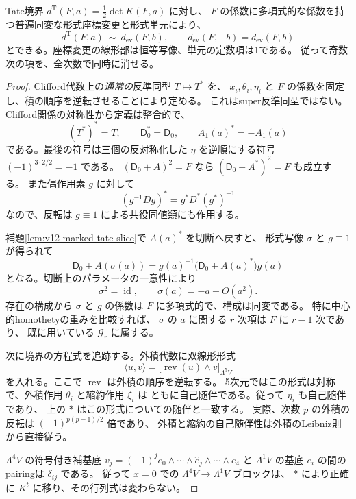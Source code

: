 \begin{theorem}[普遍境界の形式的な偶性]
\label{thm:v12-all-order-parity}
Tate境界 $d^{\mathrm T}(F,a)=\tfrac12\det K(F,a)$ に対し、
$F$ の係数に多項式的な係数を持つ普遍同変な形式座標変更と形式単元により、
\[
 d^{\mathrm T}(F,a)\ \sim\ d_{\mathrm{ev}}(F,b),\qquad
 d_{\mathrm{ev}}(F,-b)=d_{\mathrm{ev}}(F,b)
\]
とできる。座標変更の線形部は恒等写像、単元の定数項は1である。
従って奇数次の項を、全次数で同時に消せる。
\end{theorem}
\begin{proof}
Clifford代数上の\emph{通常の}反準同型 $T\mapsto T^*$ を、
$x_i,\theta_i,\eta_i$ と $F$ の係数を固定し、積の順序を逆転させることにより定める。
これはsuper反準同型ではない。
Clifford関係の対称性から定義は整合的で、
\[
 (T^*)^*=T,\qquad \mathsf D_0^*=\mathsf D_0,\qquad
 A_1(a)^*=-A_1(a)
\]
である。最後の符号は三個の反対称化した $\eta$ を逆順にする符号
$(-1)^{3\cdot2/2}=-1$ である。
$(\mathsf D_0+A)^2=F$ なら $(\mathsf D_0+A^*)^2=F$ も成立する。
また偶作用素 $g$ に対して
\[
 (g^{-1}Dg)^*=g^*D^*(g^*)^{-1}
\]
なので、反転は $g\equiv1$ による共役同値類にも作用する。

補題\ref{lem:v12-marked-tate-slice}で $A(a)^*$ を切断へ戻すと、
形式写像 $\sigma$ と $g\equiv1$ が得られて
\begin{equation}\label{eq:v12-reversion-regauging}
 \mathsf D_0+A(\sigma(a))
 =g(a)^{-1}\bigl(\mathsf D_0+A(a)^*\bigr)g(a)
\end{equation}
となる。切断上のパラメータの一意性により
\[
 \sigma^2=\operatorname{id},\qquad \sigma(a)=-a+O(a^2).
\]
存在の構成から $\sigma$ と $g$ の係数は $F$ に多項式的で、構成は同変である。
特に中心的homothetyの重みを比較すれば、
$\sigma$ の $a$ に関する $r$ 次項は $F$ に $r-1$ 次であり、
既に用いている $\mathcal G_r$ に属する。

次に境界の方程式を追跡する。外積代数に双線形形式
\[
 \langle u,v\rangle
 =\bigl[\operatorname{rev}(u)\wedge v\bigr]_{\Lambda^5V}
\]
を入れる。ここで $\operatorname{rev}$ は外積の順序を逆転する。
5次元ではこの形式は対称で、外積作用 $\theta_i$ と縮約作用 $\xi_i$ は
ともに自己随伴である。従って $\eta_i$ も自己随伴であり、
上の $*$ はこの形式についての随伴と一致する。
実際、次数 $p$ の外積の反転は $(-1)^{p(p-1)/2}$ 倍であり、
外積と縮約の自己随伴性は外積のLeibniz則から直接従う。

$\Lambda^4V$ の符号付き補基底
$v_j=(-1)^j e_0\wedge\cdots\wedge\widehat e_j\wedge\cdots\wedge e_4$
と $\Lambda^1V$ の基底 $e_i$ の間のpairingは $\delta_{ij}$ である。
従って $x=0$ での $\Lambda^4V\to\Lambda^1V$ ブロックは、
$*$ により正確に $K^t$ に移り、その行列式は変わらない。


\end{proof}
